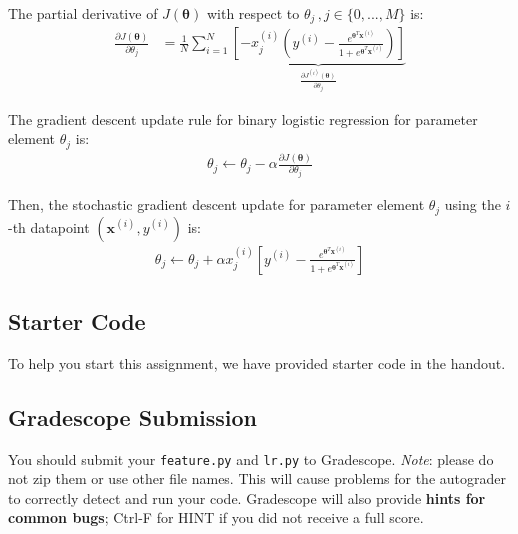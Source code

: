 \documentclass[11pt,addpoints,answers]{exam}
\newcommand{\xv}{\mathbf{x}}
\newcommand{\thetav     }{\boldsymbol \theta     }
\begin{document}
The partial derivative of $J(\thetav)$ with respect to $\theta_j \,, j\in\{0,...,M\}$ is:
\begin{align}
    \frac{\partial J(\thetav)}{\partial \theta_j} &= \frac{1}{N} \sum_{i=1}^N \underbrace{\left[-x_j^{\left(i\right)}\left(y^{(i)}-\frac{e^{\thetav^T\xv^{\left(i\right)}}}{1+e^{\thetav^T\xv^{\left(i\right)}}}\right)\right]}_{\textstyle\frac{\partial J^{(i)}(\thetav)}{\partial \theta_j}}
\end{align}


The gradient descent update rule  for binary logistic regression for parameter element $\theta_j$ is:
\begin{align}
    \theta_j \leftarrow \theta_j - \alpha \frac{\partial J(\thetav)}{\partial \theta_j}
\end{align}


Then, the stochastic gradient descent update for  parameter element $\theta_j$ using the $i$-th datapoint $(\xv^{(i)},y^{(i)})$ is:
\begin{align}
    \theta_j \leftarrow \theta_j + \alpha x_j^{\left(i\right)} \left[y^{(i)}-\frac{e^{\thetav^T\xv^{\left(i\right)}}}{1+e^{\thetav^T\xv^{\left(i\right)}}}\right]
\end{align}
 

\subsection{Starter Code}\label{startercode}

To help you start this assignment, we have provided starter code in the handout.



\subsection{Gradescope Submission }
You should submit your \texttt{feature.py} and \texttt{lr.py} to Gradescope.
\textit{Note}: please do not zip them or use other file names. This will cause problems for the autograder to correctly detect and run your code. Gradescope will also provide \textbf{hints for common bugs}; Ctrl-F for HINT if you did not receive a full score.
\end{document}
